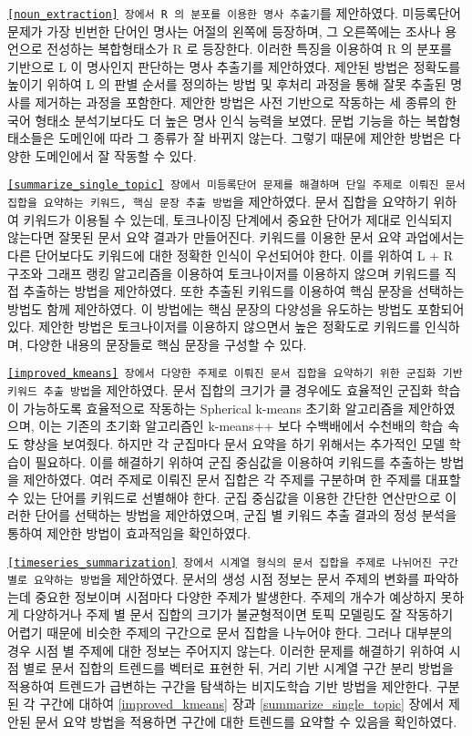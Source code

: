 \documentclass[oneside, ko,phd]{snuthesis_utf8_kor}
\begin{document}
\texttt{\ref{noun_extraction} 장에서 R 의 분포를 이용한 명사 추출기}를 제안하였다.
미등록단어 문제가 가장 빈번한 단어인 명사는 어절의 왼쪽에 등장하며, 그 오른쪽에는 조사나 용언으로 전성하는 복합형태소가 R 로 등장한다.
이러한 특징을 이용하여 R 의 분포를 기반으로 L 이 명사인지 판단하는 명사 추출기를 제안하였다.
제안된 방법은 정확도를 높이기 위하여 L 의 판별 순서를 정의하는 방법 및 후처리 과정을 통해 잘못 추출된 명사를 제거하는 과정을 포함한다.
제안한 방법은 사전 기반으로 작동하는 세 종류의 한국어 형태소 분석기보다도 더 높은 명사 인식 능력을 보였다.
문법 기능을 하는 복합형태소들은 도메인에 따라 그 종류가 잘 바뀌지 않는다.
그렇기 때문에 제안한 방법은 다양한 도메인에서 잘 작동할 수 있다.
  
\texttt{\ref{summarize_single_topic} 장에서 미등록단어 문제를 해결하며 단일 주제로 이뤄진 문서 집합을 요약하는 키워드, 핵심 문장 추출 방법}을 제안하였다.
문서 집합을 요약하기 위하여 키워드가 이용될 수 있는데, 토크나이징 단계에서 중요한 단어가 제대로 인식되지 않는다면 잘못된 문서 요약 결과가 만들어진다.
키워드를 이용한 문서 요약 과업에서는 다른 단어보다도 키워드에 대한 정확한 인식이 우선되어야 한다.
이를 위하여 L + R 구조와 그래프 랭킹 알고리즘을 이용하여 토크나이저를 이용하지 않으며 키워드를 직접 추출하는 방법을 제안하였다.
또한 추출된 키워드를 이용하여 핵심 문장을 선택하는 방법도 함께 제안하였다.
이 방법에는 핵심 문장의 다양성을 유도하는 방법도 포함되어 있다.
제안한 방법은 토크나이저를 이용하지 않으면서 높은 정확도로 키워드를 인식하며, 다양한 내용의 문장들로 핵심 문장을 구성할 수 있다.

\texttt{\ref{improved_kmeans} 장에서 다양한 주제로 이뤄진 문서 집합을 요약하기 위한 군집화 기반 키워드 추출 방법}을 제안하였다.
문서 집합의 크기가 클 경우에도 효율적인 군집화 학습이 가능하도록 효율적으로 작동하는 Spherical k-means 초기화 알고리즘을 제안하였으며, 이는 기존의 초기화 알고리즘인 k-means++ 보다 수백배에서 수천배의 학습 속도 향상을 보여줬다.
하지만 각 군집마다 문서 요약을 하기 위해서는 추가적인 모델 학습이 필요하다.
이를 해결하기 위하여 군집 중심값을 이용하여 키워드를 추출하는 방법을 제안하였다.
여러 주제로 이뤄진 문서 집합은 각 주제를 구분하며 한 주제를 대표할 수 있는 단어를 키워드로 선별해야 한다.
군집 중심값을 이용한 간단한 연산만으로 이러한 단어를 선택하는 방법을 제안하였으며, 군집 별 키워드 추출 결과의 정성 분석을 통하여 제안한 방법이 효과적임을 확인하였다.

\texttt{\ref{timeseries_summarization} 장에서 시계열 형식의 문서 집합을 주제로 나뉘어진 구간 별로 요약하는 방법}을 제안하였다.
문서의 생성 시점 정보는 문서 주제의 변화를 파악하는데 중요한 정보이며 시점마다 다양한 주제가 발생한다.
주제의 개수가 예상하지 못하게 다양하거나 주제 별 문서 집합의 크기가 불균형적이면 토픽 모델링도 잘 작동하기 어렵기 때문에 비슷한 주제의 구간으로 문서 집합을 나누어야 한다.
그러나 대부분의 경우 시점 별 주제에 대한 정보는 주어지지 않는다.
이러한 문제를 해결하기 위하여 시점 별로 문서 집합의 트렌드를 벡터로 표현한 뒤, 거리 기반 시계열 구간 분리 방법을 적용하여 트렌드가 급변하는 구간을 탐색하는 비지도학습 기반 방법을 제안한다.
구분된 각 구간에 대하여 \ref{improved_kmeans} 장과 \ref{summarize_single_topic} 장에서 제안된 문서 요약 방법을 적용하면 구간에 대한 트렌드를 요약할 수 있음을 확인하였다.
\end{document}
